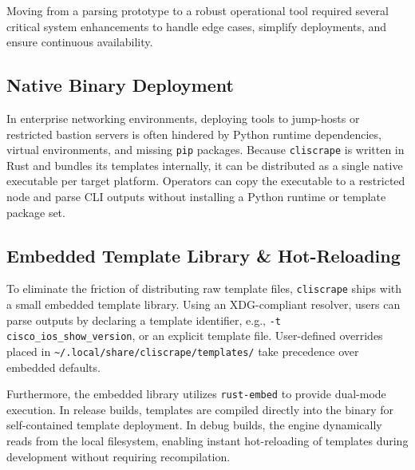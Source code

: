 \documentclass[a4paper,10pt]{article}
\begin{document}
Moving from a parsing prototype to a robust operational tool required several critical system enhancements to handle edge cases, simplify deployments, and ensure continuous availability.

\subsection{Native Binary Deployment}
In enterprise networking environments, deploying tools to jump-hosts or restricted bastion servers is often hindered by Python runtime dependencies, virtual environments, and missing \texttt{pip} packages. Because \texttt{cliscrape} is written in Rust and bundles its templates internally, it can be distributed as a single native executable per target platform. Operators can copy the executable to a restricted node and parse CLI outputs without installing a Python runtime or template package set.

\subsection{Embedded Template Library \& Hot-Reloading}
To eliminate the friction of distributing raw template files, \texttt{cliscrape} ships with a small embedded template library. Using an XDG-compliant resolver, users can parse outputs by declaring a template identifier, e.g., \texttt{-t cisco\_ios\_show\_version}, or an explicit template file. User-defined overrides placed in \texttt{\textasciitilde{}/.local/share/cliscrape/templates/} take precedence over embedded defaults.

Furthermore, the embedded library utilizes \texttt{rust-embed} to provide dual-mode execution. In release builds, templates are compiled directly into the binary for self-contained template deployment. In debug builds, the engine dynamically reads from the local filesystem, enabling instant hot-reloading of templates during development without requiring recompilation.
\end{document}
